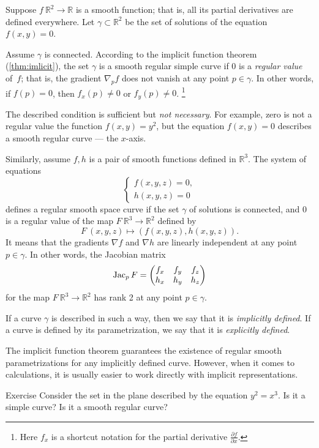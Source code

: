 Suppose $f\:\mathbb{R}^2\to \mathbb{R}$ is a smooth function; 
that is, all its partial derivatives are defined everywhere.
Let $\gamma\subset \mathbb{R}^2$ be the set of solutions of the equation $f(x,y)=0$.

Assume $\gamma$ is connected.
According to the implicit function theorem (\ref{thm:imlicit}), the set $\gamma$ is a smooth regular simple curve if $0$ is a \emph{regular value} of~$f$; that is, the gradient $\nabla_p f$ does not vanish at any point $p\in \gamma$.
In other words, if $f(p)=0$, then   
$f_x(p)\ne 0$ or $f_y(p)\ne 0$.%
\footnote{Here $f_x$ is a shortcut notation for the partial derivative
$\tfrac{\partial f}{\partial x}$.}

The described condition is sufficient but {}\emph{not necessary}.
For example, zero is not a regular value the function $f(x,y)=y^2$, but the equation $f(x,y)=0$ describes a smooth regular curve --- the $x$-axis.


Similarly, assume $f,h$ is a pair of smooth functions defined in $\mathbb{R}^3$.
The system of equations
\[\begin{cases}
   f(x,y,z)=0,
   \\
   h(x,y,z)=0
  \end{cases}
\]
defines a regular smooth space curve if the set $\gamma$ of solutions is connected, and $0$ is a regular value of the map $F\:\mathbb{R}^3\to\mathbb{R}^2$ defined by
\[F\:(x,y,z)\mapsto (f(x,y,z),h(x,y,z)).\]
It means that the gradients $\nabla f$ and $\nabla h$ are linearly independent at any point $p\in \gamma$.
In other words, the Jacobian matrix
\[
\mathop{\rm Jac}\nolimits_pF=\begin{pmatrix}
f_x&f_y&f_z\\
h_x&h_y&h_z
\end{pmatrix}
\]
for the map $F\:\mathbb{R}^3\to\mathbb{R}^2$ has rank 2 at any point $p \in \gamma$.

If a curve $\gamma$ is described in such a way,
then we say that it is \emph{implicitly defined}.
If a curve is defined by its parametrization, we say that it is \emph{explicitly defined}.

The implicit function theorem guarantees the existence of regular smooth parametrizations for any implicitly defined curve.
However, when it comes to calculations, it is usually easier to work directly with implicit representations. 

\begin{thm}{Exercise}\label{ex:y^2=x^3}
Consider the set in the plane described by the equation
$y^2=x^3$.
Is it a simple curve?
Is it a smooth regular curve?
\end{thm}

